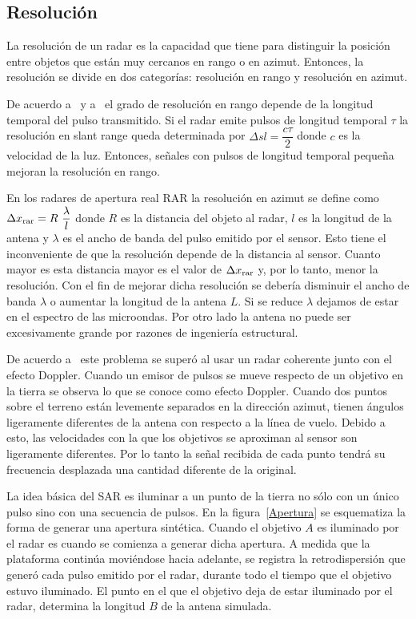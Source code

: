 \subsection{Resolución}

La resolución de un radar es la capacidad que tiene para distinguir la posición entre objetos que están muy cercanos en rango o en azimut. Entonces, la resolución se divide en dos categorías: resolución en rango y resolución en azimut. 

De acuerdo a~\citet{Sarmap2009} y a~\citet{Moreira2013} el grado de resolución en rango depende de la longitud temporal del pulso transmitido. Si el radar emite pulsos de longitud temporal $\tau$ la resolución en slant range queda determinada por $\Delta sl= \dfrac{c \tau}{2}$ donde $c$ es la velocidad de la luz. Entonces, señales con pulsos de longitud temporal pequeña mejoran la resolución en rango.

En los radares de apertura real RAR la resolución en azimut se define como $\Delta x_{\tiny \text{rar}}= R \ \dfrac{\lambda}{l}$ donde $R$ es la distancia del objeto al radar, $l$ es la longitud de la antena y $\lambda$ es el ancho de banda del pulso emitido por el sensor. Esto tiene el inconveniente de que la resolución depende de la distancia al sensor. Cuanto mayor es esta distancia mayor es el valor de $\Delta x_{\tiny \text{rar}}$ y, por lo tanto, menor la resolución. Con el fin de mejorar dicha resolución se debería disminuir el ancho de banda $\lambda$ o aumentar la longitud de la antena $L$. Si se reduce $\lambda$ dejamos de estar en el espectro de las microondas. Por otro lado la antena no puede ser excesivamente grande por razones de ingeniería estructural.

De acuerdo a~\citet{Moreira2013} este problema se superó al usar un radar coherente junto con el efecto Doppler. Cuando un emisor de pulsos se mueve respecto de un objetivo en la tierra se observa lo que se conoce como efecto Doppler. Cuando dos puntos sobre el terreno están levemente separados en la dirección azimut, tienen ángulos ligeramente diferentes de la antena con respecto a la línea de vuelo. Debido a esto, las velocidades con la que los objetivos se aproximan al sensor son ligeramente diferentes. Por lo tanto la señal recibida de cada punto tendrá su frecuencia desplazada una cantidad diferente de la original. 

La idea básica del SAR es iluminar a un punto de la tierra no sólo con un único pulso sino con una secuencia de pulsos. En la figura~\ref{Apertura} se esquematiza la forma de generar una apertura sintética. Cuando el objetivo $A$ es iluminado por el radar es cuando se comienza a generar dicha apertura. A medida que la plataforma continúa moviéndose hacia adelante, se registra la retrodispersión que generó cada pulso emitido por el radar, durante todo el tiempo que el objetivo estuvo iluminado. El punto en el que el objetivo deja de estar iluminado por el radar, determina la longitud $B$ de la antena simulada. 

